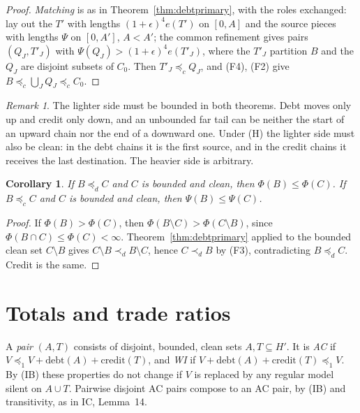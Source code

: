 \documentclass[11pt]{article}
\newtheorem{corollary}[theorem]{Corollary}
\theoremstyle{definition}\newtheorem{definition}[theorem]{Definition}
\theoremstyle{remark}\newtheorem{remark}[theorem]{Remark}
\newcommand{\debt}{\mathrm{debt}}
\newcommand{\cred}{\mathrm{credit}}
\begin{document}
\begin{proof}
\emph{Matching} is as in Theorem~\ref{thm:debtprimary}, with the roles
exchanged: lay out the $T'$ with lengths $(1+\epsilon)^4e(T')$ on $[0,A]$ and
the source pieces with lengths $\Psi$ on $[0,A']$, $A<A'$; the common
refinement gives pairs $(Q_J,T'_J)$ with $\Psi(Q_J)>(1+\epsilon)^4e(T'_J)$,
where the $T'_J$ partition $B$ and the $Q_J$ are disjoint subsets of $C_0$.
Then $T'_J\preceq_cQ_J$, and (F4), (F2) give $B\preceq_c\bigcup_JQ_J\preceq_c
C_0$.
\end{proof}

\begin{remark}\label{rem:bounded}
The lighter side must be bounded in both theorems. Debt moves only up and
credit only down, and an unbounded far tail can be neither the start of an
upward chain nor the end of a downward one. Under (H) the lighter side must
also be clean: in the debt chains it is the first source, and in the credit
chains it receives the last destination. The heavier side is arbitrary.
\end{remark}

\begin{corollary}\label{cor:agree}
If $B\preceq_dC$ and $C$ is bounded and clean, then $\Phi(B)\le\Phi(C)$. If
$B\preceq_cC$ and $C$ is bounded and clean, then $\Psi(B)\le\Psi(C)$.
\end{corollary}
\begin{proof}
If $\Phi(B)>\Phi(C)$, then $\Phi(B\setminus C)>\Phi(C\setminus B)$, since
$\Phi(B\cap C)\le\Phi(C)<\infty$. Theorem~\ref{thm:debtprimary} applied to
the bounded clean set $C\setminus B$ gives $C\setminus B\prec_dB\setminus C$,
hence $C\prec_dB$ by (F3), contradicting $B\preceq_dC$. Credit is the same.
\end{proof}

\section{Totals and trade ratios}\label{sec:totals}

A \emph{pair} $(A,T)$ consists of disjoint, bounded, clean sets
$A,T\subseteq H'$. It is \emph{AC} if $V\preceq_1V+\debt(A)+\cred(T)$, and
\emph{WI} if $V+\debt(A)+\cred(T)\preceq_1V$. By (IB) these properties do not
change if $V$ is replaced by any regular model silent on $A\cup T$. Pairwise
disjoint AC pairs compose to an AC pair, by (IB) and transitivity, as in IC,
Lemma~14.
\end{document}
